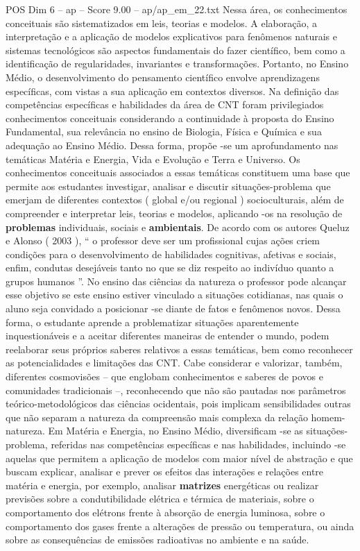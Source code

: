 \begin{textsample}{POS Dim 6 – ap – Score 9.00 – ap/ap\_em\_22.txt}
Nessa área, os conhecimentos conceituais são sistematizados em leis, teorias e modelos.
A elaboração, a interpretação e a aplicação de modelos explicativos para fenômenos naturais e sistemas tecnológicos são aspectos fundamentais do fazer científico, bem como a identificação de regularidades, invariantes e transformações.
Portanto, no Ensino Médio, o desenvolvimento do pensamento científico envolve aprendizagens específicas, com vistas a sua aplicação em contextos diversos.
Na definição das competências específicas e habilidades da área de CNT foram privilegiados conhecimentos conceituais considerando a continuidade à proposta do Ensino Fundamental, sua relevância no ensino de Biologia, Física e Química e sua adequação ao Ensino Médio.
Dessa forma, propõe -se um aprofundamento nas temáticas Matéria e Energia, Vida e Evolução e Terra e Universo.
Os conhecimentos conceituais associados a essas temáticas constituem uma base que permite aos estudantes investigar, analisar e discutir situações-problema que emerjam de diferentes contextos ( global e/ou regional ) socioculturais, além de compreender e interpretar leis, teorias e modelos, aplicando -os na resolução de \textbf{problemas} individuais, sociais e \textbf{ambientais}.
De acordo com os autores Queluz e Alonso ( 2003 ), “ o professor deve ser um profissional cujas ações criem condições para o desenvolvimento de habilidades cognitivas, afetivas e sociais, enfim, condutas desejáveis tanto no que se diz respeito ao indivíduo quanto a grupos humanos ”.
No ensino das ciências da natureza o professor pode alcançar esse objetivo se este ensino estiver vinculado a situações cotidianas, nas quais o aluno seja convidado a posicionar -se diante de fatos e fenômenos novos.
Dessa forma, o estudante aprende a problematizar situações aparentemente inquestionáveis e a aceitar diferentes maneiras de entender o mundo, podem reelaborar seus próprios saberes relativos a essas temáticas, bem como reconhecer as potencialidades e limitações das CNT.
Cabe considerar e valorizar, também, diferentes cosmovisões – que englobam conhecimentos e saberes de povos e comunidades tradicionais –, reconhecendo que não são pautadas nos parâmetros teórico-metodológicos das ciências ocidentais, pois implicam sensibilidades outras que não separam a natureza da compreensão mais complexa da relação homem-natureza.
Em Matéria e Energia, no Ensino Médio, diversificam -se as situações-problema, referidas nas competências específicas e nas habilidades, incluindo -se aquelas que permitem a aplicação de modelos com maior nível de abstração e que buscam explicar, analisar e prever os efeitos das interações e relações entre matéria e energia, por exemplo, analisar \textbf{matrizes} energéticas ou realizar previsões sobre a condutibilidade elétrica e térmica de materiais, sobre o comportamento dos elétrons frente à absorção de energia luminosa, sobre o comportamento dos gases frente a alterações de pressão ou temperatura, ou ainda sobre as consequências de emissões radioativas no ambiente e na saúde.

\end{textsample}
